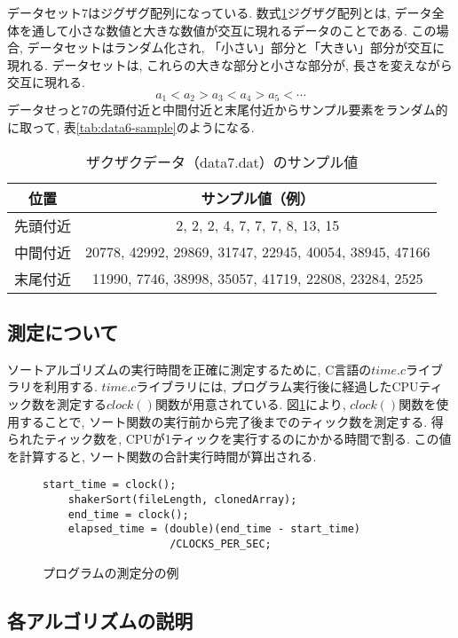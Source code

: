 \documentclass[a4j, 11pt]{jarticle}
\begin{document}
データセット7はジグザグ配列になっている. 数式\ref{tab:data7-sample}ジグザグ配列とは, データ全体を通して小さな数値と大きな数値が交互に現れるデータのことである. この場合, データセットはランダム化され, 「小さい」部分と「大きい」部分が交互に現れる. データセットは, これらの大きな部分と小さな部分が, 長さを変えながら交互に現れる. \\
\begin{equation}\label{zigzagsequence}
  a_1 < a_2 > a_3 < a_4 > a_5 < \cdots
\end{equation}
データせっと7の先頭付近と中間付近と末尾付近からサンプル要素をランダム的に取って, 表\ref{tab:data6-sample}のようになる. 
\begin{table}[H]
  \centering
  \caption{ザクザクデータ（data7.dat）のサンプル値}
  \begin{tabular}{|c|c|}
    \hline
    位置 & サンプル値（例） \\
    \hline
    先頭付近 & 2, 2, 2, 4, 7, 7, 7, 8, 13, 15 \\
    中間付近 & 20778, 42992, 29869, 31747, 22945, 40054, 38945, 47166 \\
    末尾付近 & 11990, 7746, 38998, 35057, 41719, 22808, 23284, 2525\\
    \hline
  \end{tabular}\label{tab:data7-sample}
\end{table}
\subsection{測定について}
ソートアルゴリズムの実行時間を正確に測定するために, C言語の$time.c$ライブラリを利用する. $time.c$ライブラリには, プログラム実行後に経過したCPUティック数を測定する$clock()$関数が用意されている. 図\ref{fig:clockcode}により, $clock()$関数を使用することで, ソート関数の実行前から完了後までのティック数を測定する. 得られたティック数を, CPUが1ティックを実行するのにかかる時間で割る. この値を計算すると, ソート関数の合計実行時間が算出される. 
\begin{figure}[htbp]
  \centering
  \caption{プログラムの測定分の例}\label{fig:clockcode}
  \begin{lstlisting}[basicstyle=\ttfamily\small]
    start_time = clock();
    shakerSort(fileLength, clonedArray);
    end_time = clock();
    elapsed_time = (double)(end_time - start_time)
                    /CLOCKS_PER_SEC;
  \end{lstlisting}
\end{figure}
\newpage
\subsection{各アルゴリズムの説明}
\end{document}
